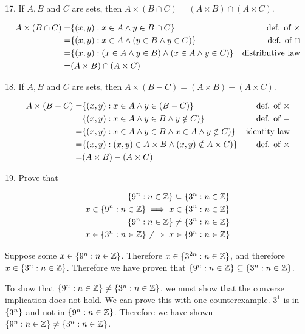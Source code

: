 \documentclass{idrisMemo}
\begin{document}
\begin{prooflist}{17. If $A, B$ and $C$ are sets, then $A \times(B \cap C)=(A \times B) \cap(A \times C)$.}
\item
\begin{align*}
    A\times (B\cap C) =& \{(x, y): x\in A \land y\in B\cap C\} & \text{def. of }\times\\
    =& \{(x,y): x\in A \land (y \in B \land y\in C)\} & \text{def. of $\cap$}\\
    =& \{(x,y): (x\in A \land y \in B) \land (x\in A \land y\in C)\} &
    \text{distributive law}\\
    =& (A\times B) \cap (A\times C)
\end{align*}
\end{prooflist}

\begin{prooflist}{18. If $A, B$ and $C$ are sets, then $A \times(B-C)=(A \times B)-(A \times C)$.}
\item
\begin{align*}
    A\times (B-C) =& \{(x, y): x\in A \land y\in (B-C)\} & \text{def. of }\times\\
    =& \{(x,y): x\in A \land y \in B \land y\notin C)\} & \text{def. of }-\\
    =& \{(x,y): x\in A \land y \in B \land x\in A \land y\notin C)\} & \text{identity law}\\
    =& \{(x,y): (x, y) \in A\times B \land (x, y) \notin A \times C)\} &
    \text{def. of }\times\\
    =& (A\times B) - (A\times C)
\end{align*}
\end{prooflist}

\begin{prooflist}{19. Prove that}
\item
\begin{align*}
\{9^n: n \in \mathbb{Z}\} \subseteq\{3^n: n \in \mathbb{Z}\}\\
x\in \{9^n: n \in \mathbb{Z}\} \implies x\in\{3^n: n \in \mathbb{Z}\}\\
\{9^n: n \in \mathbb{Z}\} \neq\{3^n: n \in \mathbb{Z}\}\\
x\in\{3^n: n \in \mathbb{Z}\}
\not\implies
x\in \{9^n: n \in \mathbb{Z}\}
\end{align*}
\item Suppose some $x\in \{9^n: n\in\mathbb{Z}\}$. Therefore $x\in\{3^{2n}:
    n\in\mathbb{Z}\}$, and therefore $x\in\{3^n: n\in\mathbb{Z}\}$. Therefore
    we have proven that $\{9^n: n \in \mathbb{Z}\} \subseteq\{3^n: n \in \mathbb{Z}\}$.
\item To show that $\{9^n: n \in \mathbb{Z}\} \neq\{3^n: n \in
    \mathbb{Z}\}$, we must show that the converse implication does not hold. We
    can prove this with one counterexample. $3^1$ is in $\{3^n\}$ and not in
    $\{9^n:n\in\mathbb{Z}\}$. Therefore we have shown
$\{9^n: n \in \mathbb{Z}\} \neq\{3^n: n \in \mathbb{Z}\}$.
\end{prooflist}
\end{document}
